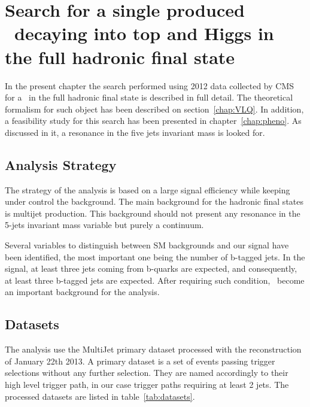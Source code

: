 \chapter[Single VLQ search]{Search for a single produced \Tp~decaying into top and Higgs in the full hadronic final state}
\label{chap:search}

In the present chapter the search performed using 2012 data collected by CMS for a \Tp~in the full hadronic final state is described in full detail. The theoretical formalism for such object has been described on section~\ref{chap:VLQ}. In addition, a feasibility study for this search has been presented in chapter~\ref{chap:pheno}. As discussed in it, a resonance in the five jets invariant mass is looked for.

\section{Analysis Strategy}
\label{sec:stra}

The strategy of the analysis is based on a large signal efficiency while keeping under control the background. The main background for the hadronic final states is multijet production. This background should not present any resonance in the 5-jets invariant mass variable but purely a continuum. %

Several variables to distinguish between SM backgrounds and our signal have been identified, the most important one being the number of b-tagged jets. In the signal, at least three jets coming from b-quarks are expected, and consequently, at least three b-tagged jets are expected. After requiring such condition, \ttbar~become an important background for the analysis. %

\section{Datasets}
\label{sec:data}

The analysis use the MultiJet primary dataset processed with the reconstruction of January 22th 2013. A primary dataset is a set of events passing trigger selections without any further selection. They are named accordingly to their high level trigger path, in our case trigger paths requiring at least 2 jets. The processed datasets are listed in table~\ref{tab:datasets}.

